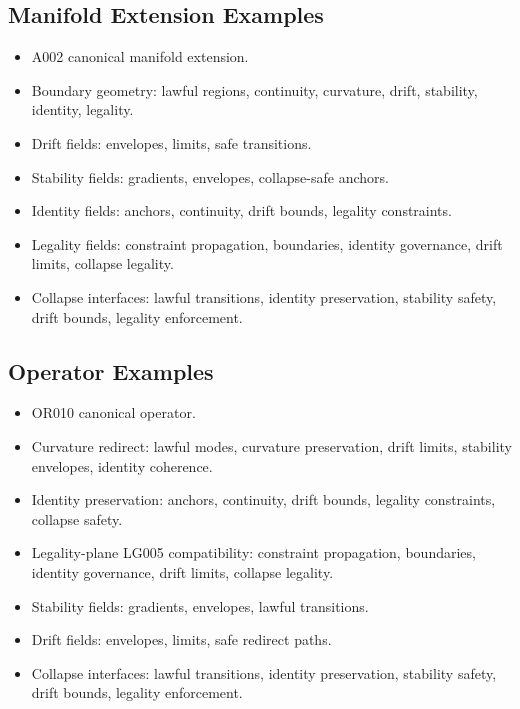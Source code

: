 \subsection{Manifold Extension Examples}
\begin{itemize}
    \item A002 canonical manifold extension.
    \item Boundary geometry: lawful regions, continuity, curvature, drift, stability, identity, legality.
    \item Drift fields: envelopes, limits, safe transitions.
    \item Stability fields: gradients, envelopes, collapse-safe anchors.
    \item Identity fields: anchors, continuity, drift bounds, legality constraints.
    \item Legality fields: constraint propagation, boundaries, identity governance, drift limits, collapse legality.
    \item Collapse interfaces: lawful transitions, identity preservation, stability safety, drift bounds, legality enforcement.
\end{itemize}

\subsection{Operator Examples}
\begin{itemize}
    \item OR010 canonical operator.
    \item Curvature redirect: lawful modes, curvature preservation, drift limits, stability envelopes, identity coherence.
    \item Identity preservation: anchors, continuity, drift bounds, legality constraints, collapse safety.
    \item Legality-plane LG005 compatibility: constraint propagation, boundaries, identity governance, drift limits, collapse legality.
    \item Stability fields: gradients, envelopes, lawful transitions.
    \item Drift fields: envelopes, limits, safe redirect paths.
    \item Collapse interfaces: lawful transitions, identity preservation, stability safety, drift bounds, legality enforcement.
\end{itemize}

